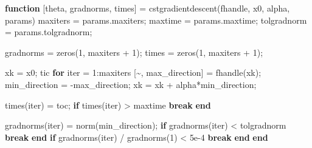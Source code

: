 \documentclass[
]{article}
\newenvironment{Shaded}{}{}
\newcommand{\FloatTok}[1]{\textcolor[rgb]{0.25,0.63,0.44}{#1}}
\newcommand{\KeywordTok}[1]{\textcolor[rgb]{0.00,0.44,0.13}{\textbf{#1}}}
\newcommand{\NormalTok}[1]{#1}
\newcommand{\OperatorTok}[1]{\textcolor[rgb]{0.40,0.40,0.40}{#1}}
\newcommand{\VariableTok}[1]{\textcolor[rgb]{0.10,0.09,0.49}{#1}}
\begin{document}
\begin{Shaded}
\begin{Highlighting}[]
\KeywordTok{function}\NormalTok{ [}\VariableTok{theta}\OperatorTok{,} \VariableTok{gradnorms}\OperatorTok{,} \VariableTok{times}\NormalTok{] }\OperatorTok{=} \VariableTok{cstgradientdescent}\NormalTok{(}\VariableTok{fhandle}\OperatorTok{,} \VariableTok{x0}\OperatorTok{,} \VariableTok{alpha}\OperatorTok{,} \VariableTok{params}\NormalTok{)}
    \VariableTok{maxiters} \OperatorTok{=} \VariableTok{params}\NormalTok{.}\VariableTok{maxiters}\OperatorTok{;}
    \VariableTok{maxtime} \OperatorTok{=} \VariableTok{params}\NormalTok{.}\VariableTok{maxtime}\OperatorTok{;}
    \VariableTok{tolgradnorm} \OperatorTok{=} \VariableTok{params}\NormalTok{.}\VariableTok{tolgradnorm}\OperatorTok{;}
    
    \VariableTok{gradnorms} \OperatorTok{=} \VariableTok{zeros}\NormalTok{(}\FloatTok{1}\OperatorTok{,} \VariableTok{maxiters} \OperatorTok{+} \FloatTok{1}\NormalTok{)}\OperatorTok{;}
    \VariableTok{times} \OperatorTok{=} \VariableTok{zeros}\NormalTok{(}\FloatTok{1}\OperatorTok{,} \VariableTok{maxiters} \OperatorTok{+} \FloatTok{1}\NormalTok{)}\OperatorTok{;}

    \VariableTok{xk} \OperatorTok{=} \VariableTok{x0}\OperatorTok{;}
    \VariableTok{tic}
    \KeywordTok{for} \VariableTok{iter} \OperatorTok{=} \FloatTok{1}\OperatorTok{:}\VariableTok{maxiters}
\NormalTok{        [}\OperatorTok{\textasciitilde{},} \VariableTok{max\_direction}\NormalTok{] }\OperatorTok{=} \VariableTok{fhandle}\NormalTok{(}\VariableTok{xk}\NormalTok{)}\OperatorTok{;}
        \VariableTok{min\_direction} \OperatorTok{=} \OperatorTok{{-}}\VariableTok{max\_direction}\OperatorTok{;}
        \VariableTok{xk} \OperatorTok{=} \VariableTok{xk} \OperatorTok{+} \VariableTok{alpha}\OperatorTok{*}\VariableTok{min\_direction}\OperatorTok{;}
        
        \VariableTok{times}\NormalTok{(}\VariableTok{iter}\NormalTok{) }\OperatorTok{=} \VariableTok{toc}\OperatorTok{;}
        \KeywordTok{if} \VariableTok{times}\NormalTok{(}\VariableTok{iter}\NormalTok{) }\OperatorTok{\textgreater{}} \VariableTok{maxtime}
            \KeywordTok{break}
        \KeywordTok{end}

        \VariableTok{gradnorms}\NormalTok{(}\VariableTok{iter}\NormalTok{) }\OperatorTok{=} \VariableTok{norm}\NormalTok{(}\VariableTok{min\_direction}\NormalTok{)}\OperatorTok{;}
        \KeywordTok{if} \VariableTok{gradnorms}\NormalTok{(}\VariableTok{iter}\NormalTok{) }\OperatorTok{\textless{}} \VariableTok{tolgradnorm}
            \KeywordTok{break}
        \KeywordTok{end}
        \KeywordTok{if} \VariableTok{gradnorms}\NormalTok{(}\VariableTok{iter}\NormalTok{) }\OperatorTok{/} \VariableTok{gradnorms}\NormalTok{(}\FloatTok{1}\NormalTok{) }\OperatorTok{\textless{}} \FloatTok{5e{-}4}
            \KeywordTok{break}
        \KeywordTok{end}
    \KeywordTok{end}
    

\end{Highlighting}
\end{Shaded}
\end{document}
